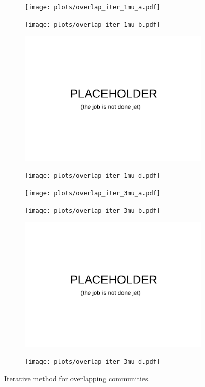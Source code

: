 \begin{figure}
    \centering
    \begin{subfigure}{0.5\textwidth}
    \texttt{[image: plots/overlap\_iter\_1mu\_a.pdf]}
    \end{subfigure}%
    \begin{subfigure}{0.5\textwidth}
    \texttt{[image: plots/overlap\_iter\_1mu\_b.pdf]}
    \end{subfigure}
    \begin{subfigure}{0.5\textwidth}
    \includegraphics[width=0.8\linewidth]{plots/placeholder.pdf}
    \end{subfigure}%
    \begin{subfigure}{0.5\textwidth}
    \texttt{[image: plots/overlap\_iter\_1mu\_d.pdf]}
    \end{subfigure}
    \begin{subfigure}{0.5\textwidth}
    \texttt{[image: plots/overlap\_iter\_3mu\_a.pdf]}
    \end{subfigure}%
    \begin{subfigure}{0.5\textwidth}
    \texttt{[image: plots/overlap\_iter\_3mu\_b.pdf]}
    \end{subfigure}
    \begin{subfigure}{0.5\textwidth}
    \includegraphics[width=0.8\linewidth]{plots/placeholder.pdf}
    \end{subfigure}%
    \begin{subfigure}{0.5\textwidth}
    \texttt{[image: plots/overlap\_iter\_3mu\_d.pdf]}
    \end{subfigure}
    \label{fig:iter_overlap}
    \caption{Iterative method for overlapping communities.}
\end{figure}

